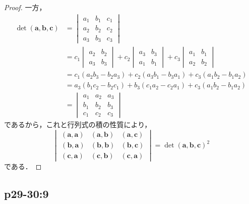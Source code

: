 \documentclass[uplatex,dvipdfmx,a4paper,11pt,fleqn]{jsarticle}
\begin{document}
\begin{tleftbar}
\begin{proof}
    一方，
    \begin{align*}
        \det (\bm{a},\bm{b},\bm{c})&=
        \begin{vmatrix}
            a_1 & b_1 & c_1 \\
            a_2 & b_2 & c_2 \\
            a_3 & b_3 & c_3
        \end{vmatrix} \\
        & = c_1
        \begin{vmatrix}
            a_2 & b_2 \\
            a_3 & b_3 
        \end{vmatrix}
        + c_2
        \begin{vmatrix}
            a_3 & b_3 \\
            a_1 & b_1
        \end{vmatrix}
        + c_3
        \begin{vmatrix}
            a_1 & b_1 \\
            a_2 & b_2
        \end{vmatrix}
        \\
        & = c_1 (a_2 b_3-b_2 a_3)+c_2 (a_3 b_1 - b_3 a_1)+c_3 (a_1 b_2 -b_1 a_2)\\
        & = a_3 (b_1 c_2 - b_2 c_1)+b_3 (c_1 a_2-c_2 a_1)+ c_3 (a_1 b_2 - b_1 a_2)\\
        & =
        \begin{vmatrix}
            a_1 & a_2 & a_3 \\
            b_1 & b_2 & b_3 \\
            c_1 & c_2 & c_3
        \end{vmatrix}
    \end{align*}
    であるから，これと行列式の積の性質により，
    \[
        \begin{vmatrix}
            (\bm{a},\bm{a}) & (\bm{a},\bm{b}) & (\bm{a},\bm{c}) \\
            (\bm{b},\bm{a}) & (\bm{b},\bm{b}) & (\bm{b},\bm{c}) \\
            (\bm{c},\bm{a}) & (\bm{c},\bm{b}) & (\bm{c},\bm{a})
        \end{vmatrix}
        = {\det (\bm{a},\bm{b},\bm{c})}^2
    \]
    である．
    \end{proof}
\end{tleftbar}


\subsection*{p29-30:9}
\end{document}
